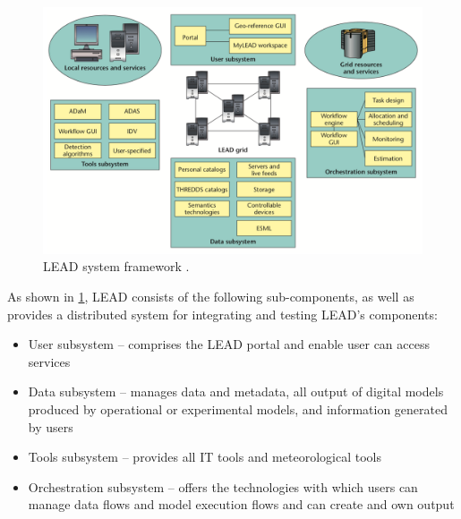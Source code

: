 \begin{figure}[htp]
    \centering
    \includegraphics[width=1.0\textwidth]{lit/lead/LEAD-system-framework-LEAD-is-composed-of-several-interacting-subsystems-with-the-LEAD_W640.png}
    \caption[LEAD system framework]{LEAD system framework \cite{Droegemeier2005Service-orientedWeather}.}
    \label{fi:lead_framework}
\end{figure}

As shown in \cref{fi:lead_framework}, LEAD consists of the following sub-components, as well as provides a distributed system for integrating and testing LEAD's components:
\begin{itemize}
    \item User subsystem – comprises the LEAD portal and enable user can access services
    \item Data subsystem – manages data and metadata, all output of digital models produced by operational or experimental models, and information generated by users
    \item Tools subsystem – provides all IT tools and meteorological tools
    \item Orchestration subsystem – offers the technologies with which users can manage data flows and model execution flows and can create and own output
\end{itemize}


